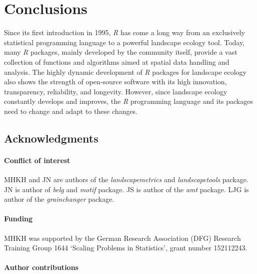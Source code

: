 \documentclass[smallextended]{svjour3}       %
\begin{document}
\hypertarget{conclusions}{%
\section{Conclusions}\label{conclusions}}

Since its first introduction in 1995, \emph{R} has come a long way from an exclusively statistical programming language to a powerful landscape ecology tool.
Today, many \emph{R} packages, mainly developed by the community itself, provide a vast collection of functions and algorithms aimed at spatial data handling and analysis.
The highly dynamic development of \emph{R} packages for landscape ecology also shows the strength of open-source software with its high innovation, transparency, reliability, and longevity.
However, since landscape ecology constantly develops and improves, the \emph{R} programming language and its packages need to change and adapt to these changes.

\hypertarget{acknowledgments}{%
\subsection{Acknowledgments}\label{acknowledgments}}

\hypertarget{conflict-of-interest}{%
\paragraph{Conflict of interest}\label{conflict-of-interest}}

MHKH and JN are authors of the \emph{landscapemetrics} and \emph{landscapetools} package.
JN is author of \emph{belg} and \emph{motif} package. JS is author of the \emph{amt} package. LJG is author of the \emph{grainchanger} package.

\hypertarget{funding}{%
\paragraph{Funding}\label{funding}}

MHKH was supported by the German Research Association (DFG) Research Training Group 1644 `Scaling Problems in Statistics', grant number 152112243.

\hypertarget{author-contributions}{%
\paragraph{Author contributions}\label{author-contributions}}
\end{document}
